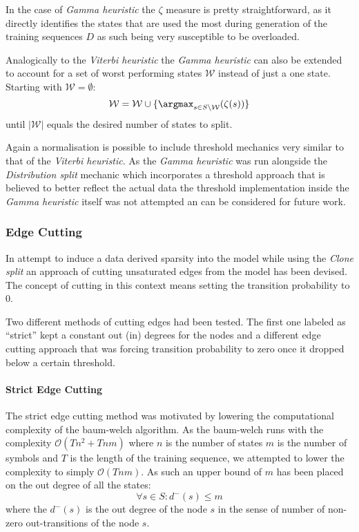 In the case of \emph{Gamma heuristic} the $\zeta$ measure is pretty straightforward, as it directly identifies the states that are used the most during generation of the training sequences $D$ as such being very susceptible to be overloaded.

Analogically to the \emph{Viterbi heuristic} the \emph{Gamma heuristic} can also be extended to account for a set of worst performing states $\mathcal{W}$ instead of just a one state. Starting with $\mathcal{W}=\emptyset$:
$$\mathcal{W} = \mathcal{W} \cup \{\argmax_{s\in S\setminus \mathcal{W}}(\zeta(s))\}$$
until $|\mathcal{W}|$ equals the desired number of states to split.

Again a normalisation is possible to include threshold mechanics very similar to that of the \emph{Viterbi heuristic}. As the \emph{Gamma heuristic} was run alongside the \emph{Distribution split} mechanic which incorporates a threshold approach that is believed to better reflect the actual data the threshold implementation inside the \emph{Gamma heuristic} itself was not attempted an can be considered for future work.

\subsubsection{Edge Cutting}
In attempt to induce a data derived sparsity into the model while using the \emph{Clone split} an approach of cutting unsaturated edges from the model has been devised. The concept of cutting in this context means setting the transition probability to $0$.

Two different methods of cutting edges had been tested. The first one labeled as ``strict'' kept a constant out (in) degrees for the nodes and a different edge cutting approach that was forcing transition probability to zero once it dropped below a certain threshold.

\paragraph {Strict Edge Cutting}
The strict edge cutting method was motivated by lowering the computational complexity of the \gls{baum-welch} algorithm. As the \gls{baum-welch} runs with the complexity $\mathcal{O}(Tn^2+Tnm)$ where $n$ is the number of states $m$ is the number of symbols and $T$ is the length of the training sequence, we attempted to lower the complexity to simply $\mathcal{O}(Tnm)$. As such an upper bound of $m$ has been placed on the out degree of all the states: $$\forall s\in S: d^-(s) \le m$$ where the $d^-(s)$ is the out degree of the node $s$ in the sense of number of non-zero out-transitions of the node $s$.

